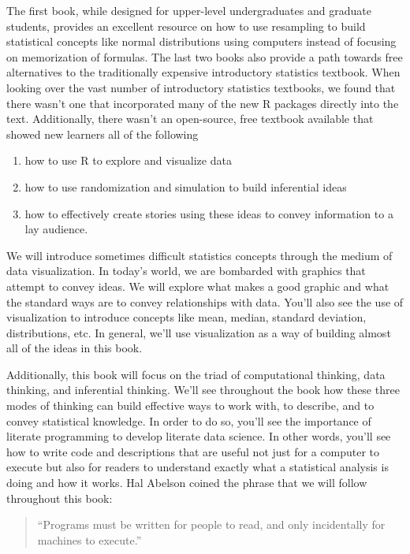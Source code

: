 \documentclass[]{tufte-book}
\providecommand{\tightlist}{%
  \setlength{\itemsep}{0pt}\setlength{\parskip}{0pt}}
\begin{document}
The first book, while designed for upper-level undergraduates and
graduate students, provides an excellent resource on how to use
resampling to build statistical concepts like normal distributions using
computers instead of focusing on memorization of formulas. The last two
books also provide a path towards free alternatives to the traditionally
expensive introductory statistics textbook. When looking over the vast
number of introductory statistics textbooks, we found that there wasn't
one that incorporated many of the new R packages directly into the text.
Additionally, there wasn't an open-source, free textbook available that
showed new learners all of the following

\begin{enumerate}
\def\labelenumi{\arabic{enumi}.}
\tightlist
\item
  how to use R to explore and visualize data
\item
  how to use randomization and simulation to build inferential ideas
\item
  how to effectively create stories using these ideas to convey
  information to a lay audience.
\end{enumerate}

We will introduce sometimes difficult statistics concepts through the
medium of data visualization. In today's world, we are bombarded with
graphics that attempt to convey ideas. We will explore what makes a good
graphic and what the standard ways are to convey relationships with
data. You'll also see the use of visualization to introduce concepts
like mean, median, standard deviation, distributions, etc. In general,
we'll use visualization as a way of building almost all of the ideas in
this book.

Additionally, this book will focus on the triad of computational
thinking, data thinking, and inferential thinking. We'll see throughout
the book how these three modes of thinking can build effective ways to
work with, to describe, and to convey statistical knowledge. In order to
do so, you'll see the importance of literate programming to develop
literate data science. In other words, you'll see how to write code and
descriptions that are useful not just for a computer to execute but also
for readers to understand exactly what a statistical analysis is doing
and how it works. Hal Abelson coined the phrase that we will follow
throughout this book:

\begin{quote}
``Programs must be written for people to read, and only incidentally for
machines to execute.''
\end{quote}
\end{document}
